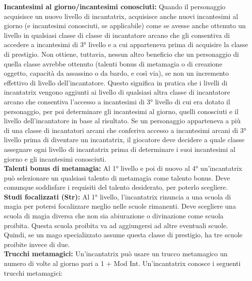 \documentclass[10pt, a4paper]{report}
\begin{document}
\begin{multicols}{2}
\textbf{Incantesimi al giorno/incantesimi conosciuti:} Quando il personaggio acquisisce un nuovo livello di incantatrix, acquisisce anche nuovi incantesimi al giorno (e incantesimi conosciuti, se applicabile) come se avesse anche ottenuto un livello in qualsiasi classe di classe di incantatore arcano che gli consentiva di accedere a incantesimi di 3° livello e a cui apparteneva prima di acquisire la classe di prestigio. Non ottiene, tuttavia, nessun altro beneficio che un personaggio di quella classe avrebbe ottenuto (talenti bonus di metamagia o di creazione oggetto, capacità da assassino o da bardo, e così via), se non un incremento effettivo di livello dell'incantatore. Questo significa in pratica che i livelli di incantatrix vengono aggiunti ai livello di qualsiasi altra classe di incantatore arcano che consentiva l'accesso a incantesimi di 3° livello di cui era dotato il personaggio, per poi determinare gli incantesimi al giorno, quelli conosciuti e il livello dell'incantatore in base al risultato.
Se un personaggio apparteneva a più di una classe di incantatori arcani che conferiva accesso a incantesimi arcani di 3° livello prima di diventare un incantatrix, il giocatore deve decidere a quale classe assegnare ogni livello di incantatrix prima di determinare i suoi incantesimi al giorno e gli incantesimi conosciuti.\\

\textbf{Talenti bonus di metamagia:} Al 1° livello e poi di nuovo al 4° un'incantatrix può selezionare un qualsiasi talento di metamagia come talento bonus. Deve comunque soddisfare i requisiti del talento desiderato, per poterlo scegliere.\\

\textbf{Studi focalizzati (Str):} Al 1° livello, l'incantatrix rinuncia a una scuola di magia per potersi focalizzare meglio nelle scuole rimanenti. Deve scegliere una scuola di magia diversa che non sia abiurazione o divinazione come scuola proibita. Questa scuola proibita va ad aggiungersi ad altre eventuali scuole. Quindi, se un mago specializzato assume questa classe di prestigio, ha tre scuole proibite invece di due.\\

\textbf{Trucchi metamagici:} Un'incantatrix può usare un trucco metamagico un numero di volte al giorno pari a 1 + Mod Int. Un'incantatrix conosce i seguenti trucchi metamagici:


\end{multicols}
\end{document}
